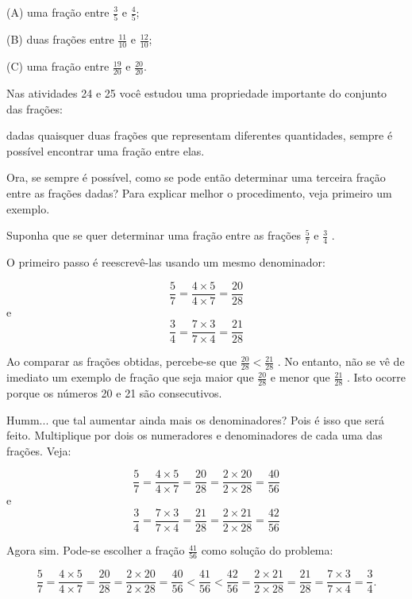 \documentclass[a4,12pt]{book}
\begin{document}
(A) uma fração entre $\frac{3}{5}$ e $\frac{4}{5}$;

(B) duas frações entre $\frac{11}{10}$ e $\frac{12}{10}$;

(C) uma fração entre $\frac{19}{20}$ e $\frac{20}{20}$.









\begin{refletindo*}[breakable]{}{}  
  
  Nas atividades 24 e 25 você estudou uma propriedade importante do conjunto das frações:  
  
  dadas quaisquer duas frações que representam diferentes quantidades, sempre é possível encontrar uma  fração entre elas.   
  
  
  Ora, se sempre é possível, como se pode então determinar uma terceira fração entre as frações dadas? Para explicar melhor o procedimento, veja primeiro um exemplo.  
  
  Suponha que se quer determinar uma fração entre as frações   $\frac{5}{7}$   e   $\frac{3}{4}$  .  
  
  O primeiro passo é reescrevê-las usando um mesmo denominador:  
  
  $$\dfrac{5}{7} = \dfrac{4 \times 5}{ 4 \times 7} = \dfrac{20}{28}$$  
  e  
  $$\dfrac{3}{4} = \dfrac{7 \times 3}{ 7 \times 4} = \dfrac{21}{28}$$  
  
  Ao comparar as frações obtidas, percebe-se que   $\frac{20}{28}<\frac{21}{28}$  . No entanto, não se vê de imediato um exemplo de fração que seja maior que   $\frac{20}{28}$   e menor que   $\frac{21}{28}$  . Isto ocorre porque os números 20 e 21 são consecutivos.  
  
  Humm... que tal aumentar ainda mais os denominadores? Pois é isso que será feito.  Multiplique por dois os numeradores e denominadores de cada uma das frações. Veja:  
  
  $$\dfrac{5}{7} = \dfrac{4 \times 5}{ 4 \times 7} = \dfrac{20}{28} = \dfrac{2 \times 20}{ 2 \times 28} = \dfrac{40}{56}$$  
  e  
  $$\dfrac{3}{4} = \dfrac{7 \times 3}{ 7 \times 4} = \dfrac{21}{28} = \dfrac{2 \times 21}{2 \times 28} = \dfrac{42}{56}$$  
  
  Agora sim. Pode-se escolher a fração   $\frac{41}{56}$   como solução do problema:  
  
  $$\dfrac{5}{7} = \dfrac{4 \times 5}{ 4 \times 7} = \dfrac{20}{28} = \dfrac{2 \times 20}{ 2 \times 28} = \dfrac{40}{56} < \dfrac{41}{56} < \dfrac{42}{56} = \dfrac{2 \times 21}{2 \times 28} =  \dfrac{21}{28} = \dfrac{7 \times 3}{ 7 \times 4} = \dfrac{3}{4}.$$  
  

\end{refletindo*}
\end{document}
